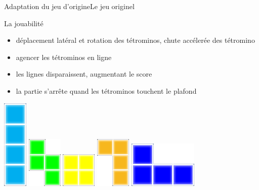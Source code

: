 \documentclass[french]{beamer}
\begin{document}
\begin{frame}{Adaptation du jeu d'origine}{Le jeu originel}
	\begin{block}{La jouabilité}
		\begin{itemize}
			\item déplacement latéral et rotation des tétrominos, chute accélerée des tétromino
			\item agencer les tétrominos en ligne
			\item les lignes disparaissent, augmentant le score
			\item la partie s'arrête quand les tétrominos touchent le plafond
		\end{itemize}

	\end{block}

	\begin{center}
		\includegraphics[scale=0.3]{img/1.png}
		\includegraphics[scale=0.4]{img/2.png}
		\includegraphics[scale=0.4]{img/3.png}
		\includegraphics[scale=0.4]{img/4.png}
		\includegraphics[scale=0.3]{img/5.png}

\end{center}
\end{frame}
\end{document}
